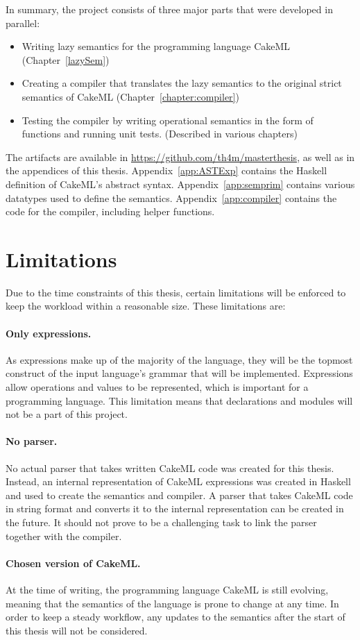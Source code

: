 In summary, the project consists of three major parts that were developed
in parallel:
\begin{itemize}
 \item Writing lazy semantics for the programming language CakeML (Chapter~\ref{lazySem})
 \item Creating a compiler that translates the lazy semantics to the original strict semantics of CakeML (Chapter~\ref{chapter:compiler})
 \item Testing the compiler by writing operational semantics in the form of functions and running unit tests. (Described in various chapters)
\end{itemize}

The artifacts are available in \url{https://github.com/th4m/masterthesis}, as
well as in the appendices of this thesis. Appendix~\ref{app:ASTExp} contains the
Haskell definition of CakeML's abstract syntax. Appendix~\ref{app:semprim}
contains various datatypes used to define the semantics.
Appendix~\ref{app:compiler} contains the code for the compiler, including helper
functions.

\section{Limitations}
\label{sec:limitations}
Due to the time constraints of this thesis, certain limitations will be enforced
to keep the workload within a reasonable size. These limitations are:

\paragraph{Only expressions.}
As expressions make up of the majority of the language, they will be the topmost
construct of the input language's grammar that will be implemented. Expressions
allow operations and values to be represented, which is important for a
programming language. This limitation means that declarations and modules will
not be a part of this project.

\paragraph{No parser.}
No actual parser that takes written CakeML code was created for this thesis.
Instead, an internal representation of CakeML expressions was created in
Haskell and used to create the semantics and compiler. A parser that
takes CakeML code in string format and converts it to the internal
representation can be created in the future. It should not prove to
be a challenging task to link the parser together with the compiler.

\paragraph{Chosen version of CakeML.}
At the time of writing, the programming language CakeML is still evolving,
meaning that the semantics of the language is prone to change at
any time. In order to keep a steady workflow, any updates to the semantics after
the start of this thesis will not be considered.
